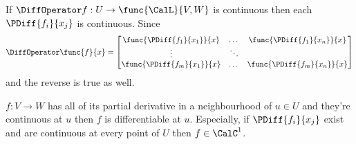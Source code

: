 \begin{remark}
    If \(\DiffOperator f: U \to \func{\CalL}{V,W}\) is continuous then each \(\PDiff{f_i}{x_j}\) is continuous. Since
    \begin{equation*}
        \DiffOperator \func{f}{x} = \begin{bmatrix}
            \func{\PDiff{f_1}{x_1}}{x} & \dots  & \func{\PDiff{f_1}{x_n}}{x} \\
            \vdots                     & \ddots &                            \\
            \func{\PDiff{f_m}{x_1}}{x} & \dots  & \func{\PDiff{f_m}{x_n}}{x}
        \end{bmatrix}
    \end{equation*}
    and the reverse is true as well.
\end{remark}

\begin{theorem} \label{th:DifferentiabilityCriteria}
    \(f : V \to W\) has all of its partial derivative in a neighbourhood of \(u \in U\) and they're continuous at \(u\) then \(f\) is differentiable at \(u\). Especially, if \(\PDiff{f_i}{x_j}\) exist and are continuous at every point of \(U\) then \(f \in \CalC^1\).
\end{theorem}


